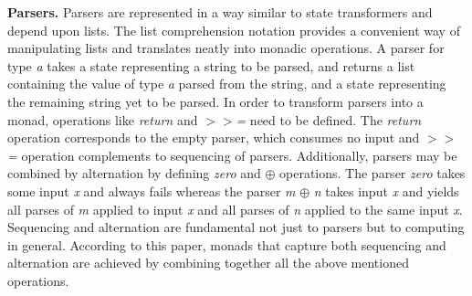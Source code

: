 \documentclass{article}
\begin{document}
\textbf{Parsers.} Parsers are represented in a way similar to state transformers and depend upon lists. The list comprehension notation provides a convenient way of manipulating lists and translates neatly into monadic operations. A parser for type \textit{a}  takes a state representing a string to be parsed, and returns a list containing the value of type \textit{a} parsed from the string, and a state representing the remaining string yet to be parsed. In order to transform parsers into a monad, operations like \textit{return} and \textit{${>>}$=} need to be defined. The \textit{return} operation corresponds to the empty parser, which consumes no input and \textit{${>>}$=} operation complements to sequencing of parsers. Additionally, parsers may be combined by alternation by defining \textit{zero} and ${\oplus}$ operations. The parser \textit{zero} takes some input \textit{x} and always fails whereas the parser \textit{m} ${\oplus}$ \textit{n} takes input \textit{x} and yields all parses of \textit{m} applied to input \textit{x} and all parses of \textit{n} applied to the same input \textit{x}. Sequencing and alternation are fundamental not just to parsers but to computing in general. According to this paper, monads that capture both sequencing and alternation are achieved by combining together all the above mentioned operations.
\end{document}
